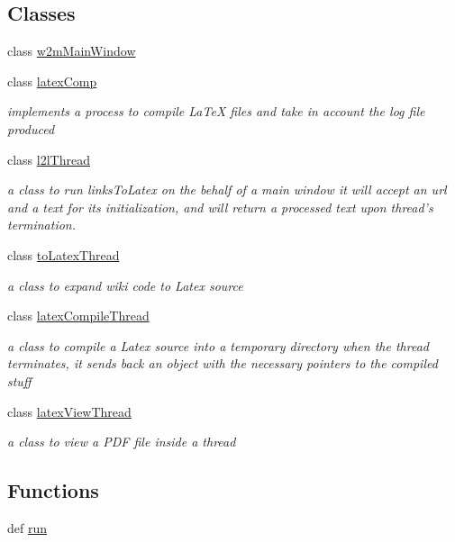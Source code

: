 \subsection*{\-Classes}
\begin{DoxyCompactItemize}
\item 
class \hyperlink{classuicilibris_1_1w2mMainWindow}{w2m\-Main\-Window}
\item 
class \hyperlink{classuicilibris_1_1latexComp}{latex\-Comp}
\begin{DoxyCompactList}\small\item\em implements a process to compile \-La\-Te\-X files and take in account the log file produced \end{DoxyCompactList}\item 
class \hyperlink{classuicilibris_1_1l2lThread}{l2l\-Thread}
\begin{DoxyCompactList}\small\item\em a class to run links\-To\-Latex on the behalf of a main window it will accept an url and a text for its initialization, and will return a processed text upon thread's termination. \end{DoxyCompactList}\item 
class \hyperlink{classuicilibris_1_1toLatexThread}{to\-Latex\-Thread}
\begin{DoxyCompactList}\small\item\em a class to expand wiki code to \-Latex source \end{DoxyCompactList}\item 
class \hyperlink{classuicilibris_1_1latexCompileThread}{latex\-Compile\-Thread}
\begin{DoxyCompactList}\small\item\em a class to compile a \-Latex source into a temporary directory when the thread terminates, it sends back an object with the necessary pointers to the compiled stuff \end{DoxyCompactList}\item 
class \hyperlink{classuicilibris_1_1latexViewThread}{latex\-View\-Thread}
\begin{DoxyCompactList}\small\item\em a class to view a \-P\-D\-F file inside a thread \end{DoxyCompactList}\end{DoxyCompactItemize}
\subsection*{\-Functions}
\begin{DoxyCompactItemize}
\item 
def \hyperlink{namespaceuicilibris_a3f211a0d9bc4789687c09e589b7b5610}{run}
\end{DoxyCompactItemize}
